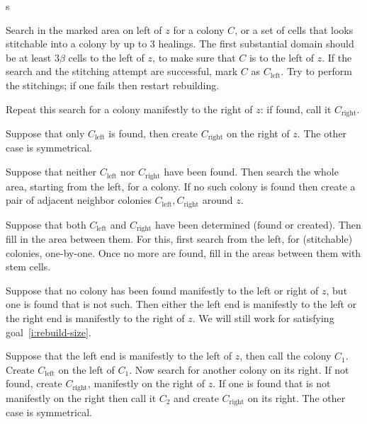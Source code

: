 \documentclass[11pt]{memoir}
\theoremstyle{definition} %
\newcommand{\Left}{\text{left}}
\newcommand{\Right}{\text{right}}
\begin{document}
\begin{varenum}{s}
\item\label{i:survey.left}
Search in the marked area on left of \( z \) for a colony \( C \),
or a set of cells that looks stitchable into a colony by up to 3 healings.
The first substantial domain should be at least \( 3\beta \) cells to the left of \( z \),
to make sure that \( C \) is  to the left of \( z \).
If the search and the stitching attempt are successful, mark \( C \) as \( C_{\Left} \).
Try to perform the stitchings; if one fails then restart rebuilding.

Repeat this search for a colony manifestly to the right of \( z \): if found, call it \( C_{\Right} \).

\item Suppose that only \( C_{\Left} \) is found, then create \( C_{\Right} \) on the right of \( z \).
The other case is symmetrical.

\item Suppose that neither \( C_{\Left} \) nor \( C_{\Right} \) have been found.
Then search the whole area, starting from the left, for a colony.
If no such colony is found then create a pair of adjacent
neighbor colonies \( C_{\Left},C_{\Right} \) around \( z \).

\item\label{i:survey.both} Suppose that both \( C_{\Left} \) and \( C_{\Right} \) 
  have been determined (found or created).
  Then fill in the area between them.
  For this, first search from the left, for (stitchable) colonies, one-by-one.
  Once no more are found, fill in the areas between them with stem cells.

\item Suppose that no colony has been found 
  manifestly to the left or right of \( z \), but one is found that is not such.
  Then either the left end is manifestly to the left or
the right end is manifestly to the right of \( z \).
We will still work for satisfying goal~\eqref{i:rebuild-size}.

Suppose that the left end is manifestly to the left of \( z \), then call the colony \( C_{1} \).
Create \( C_{\Left} \) on the left of  \( C_{1} \).
Now search for another colony on its right.
If not found, create \( C_{\Right} \), manifestly on the right of \( z \).
If one is found that is not manifestly on the right then
call it \( C_{2} \) and create \( C_{\Right} \) on its right.
The other case is symmetrical.

\end{varenum}
\end{document}
